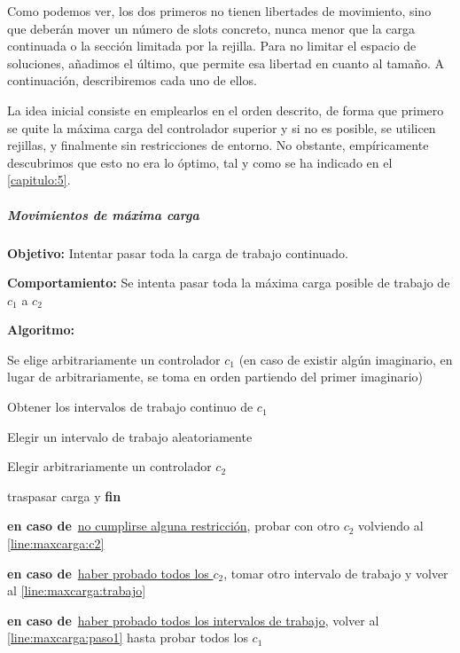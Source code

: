 Como podemos ver, los dos primeros no tienen libertades de movimiento, sino que deberán mover un número de slots concreto, nunca menor que la carga continuada o la sección limitada por la rejilla. Para no limitar el espacio de soluciones, añadimos el último, que permite esa libertad en cuanto al tamaño. A continuación, describiremos cada uno de ellos.

La idea inicial consiste en emplearlos en el orden descrito, de forma que primero se quite la máxima carga del controlador superior y si no es posible, se utilicen rejillas, y finalmente sin restricciones de entorno. No obstante, empíricamente descubrimos que esto no era lo óptimo, tal y como se ha indicado en el \autoref{capitulo:5}.

\subparagraph{Movimientos de máxima carga}
\label{entorno:movMaxCarga}

\textbf{Objetivo:} Intentar pasar toda la carga de trabajo continuado.

\textbf{Comportamiento:} Se intenta pasar toda la máxima carga posible de trabajo de $c_1$ a $c_2$

\textbf{Algoritmo:}
\SetAlgoNoLine
\LinesNumbered
\SetAlgoNoEnd
\DontPrintSemicolon
\begin{algorithm}[h]
    \label{algoritmo:movMaxCarga}
    \SetAlgoNoEnd
    Se elige arbitrariamente un controlador $c_1$ (en caso de existir algún imaginario, en lugar de arbitrariamente, se toma en orden partiendo \newline del primer imaginario) \label{line:maxcarga:paso1}\;
    \algovspace

    Obtener los intervalos de trabajo continuo de $c_1$\;
    \algovspace

    Elegir un intervalo de trabajo aleatoriamente \label{line:maxcarga:trabajo}\;
    \algovspace

    Elegir arbitrariamente un controlador $c_2$ \label{line:maxcarga:c2}\;
    \algovspace

    {traspasar carga y \textbf{fin}}
    \algovspace

    \textbf{en caso de\,} \underline{no cumplirse alguna restricción}, probar con otro $c_2$ volviendo al \autoref{line:maxcarga:c2}\;
    \algovspace

    \textbf{en caso de\,} \underline{haber probado todos los $c_2$}, tomar otro intervalo de trabajo y volver al \autoref{line:maxcarga:trabajo}\;
    \algovspace

    \textbf{en caso de\,} \underline{haber probado todos los intervalos de trabajo}, volver al \autoref{line:maxcarga:paso1} hasta probar todos los $c_1$\;
    \algovspace
\end{algorithm}

